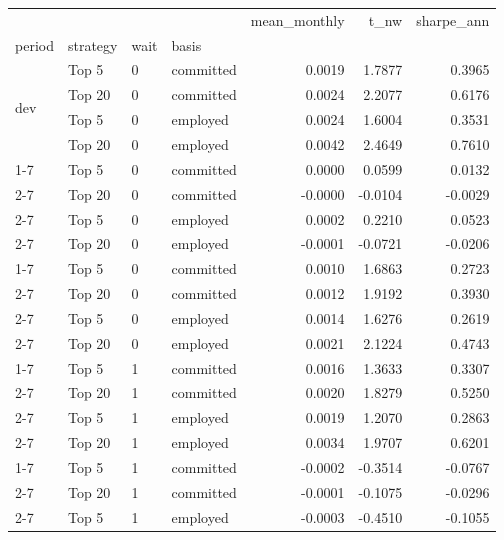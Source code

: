 \begin{tabular}{llllrrr}
\toprule
 &  &  &  & mean_monthly & t_nw & sharpe_ann \\
period & strategy & wait & basis &  &  &  \\
\midrule
\multirow[t]{4}{*}{dev} & Top 5 & 0 & committed & 0.0019 & 1.7877 & 0.3965 \\
\cline{2-7} \cline{3-7}
 & Top 20 & 0 & committed & 0.0024 & 2.2077 & 0.6176 \\
\cline{2-7} \cline{3-7}
 & Top 5 & 0 & employed & 0.0024 & 1.6004 & 0.3531 \\
\cline{2-7} \cline{3-7}
 & Top 20 & 0 & employed & 0.0042 & 2.4649 & 0.7610 \\
\cline{1-7} \cline{2-7} \cline{3-7}
\multirow[t]{4}{*}{holdout} & Top 5 & 0 & committed & 0.0000 & 0.0599 & 0.0132 \\
\cline{2-7} \cline{3-7}
 & Top 20 & 0 & committed & -0.0000 & -0.0104 & -0.0029 \\
\cline{2-7} \cline{3-7}
 & Top 5 & 0 & employed & 0.0002 & 0.2210 & 0.0523 \\
\cline{2-7} \cline{3-7}
 & Top 20 & 0 & employed & -0.0001 & -0.0721 & -0.0206 \\
\cline{1-7} \cline{2-7} \cline{3-7}
\multirow[t]{4}{*}{full} & Top 5 & 0 & committed & 0.0010 & 1.6863 & 0.2723 \\
\cline{2-7} \cline{3-7}
 & Top 20 & 0 & committed & 0.0012 & 1.9192 & 0.3930 \\
\cline{2-7} \cline{3-7}
 & Top 5 & 0 & employed & 0.0014 & 1.6276 & 0.2619 \\
\cline{2-7} \cline{3-7}
 & Top 20 & 0 & employed & 0.0021 & 2.1224 & 0.4743 \\
\cline{1-7} \cline{2-7} \cline{3-7}
\multirow[t]{4}{*}{dev} & Top 5 & 1 & committed & 0.0016 & 1.3633 & 0.3307 \\
\cline{2-7} \cline{3-7}
 & Top 20 & 1 & committed & 0.0020 & 1.8279 & 0.5250 \\
\cline{2-7} \cline{3-7}
 & Top 5 & 1 & employed & 0.0019 & 1.2070 & 0.2863 \\
\cline{2-7} \cline{3-7}
 & Top 20 & 1 & employed & 0.0034 & 1.9707 & 0.6201 \\
\cline{1-7} \cline{2-7} \cline{3-7}
\multirow[t]{4}{*}{holdout} & Top 5 & 1 & committed & -0.0002 & -0.3514 & -0.0767 \\
\cline{2-7} \cline{3-7}
 & Top 20 & 1 & committed & -0.0001 & -0.1075 & -0.0296 \\
\cline{2-7} \cline{3-7}
 & Top 5 & 1 & employed & -0.0003 & -0.4510 & -0.1055 \\

\end{tabular}
